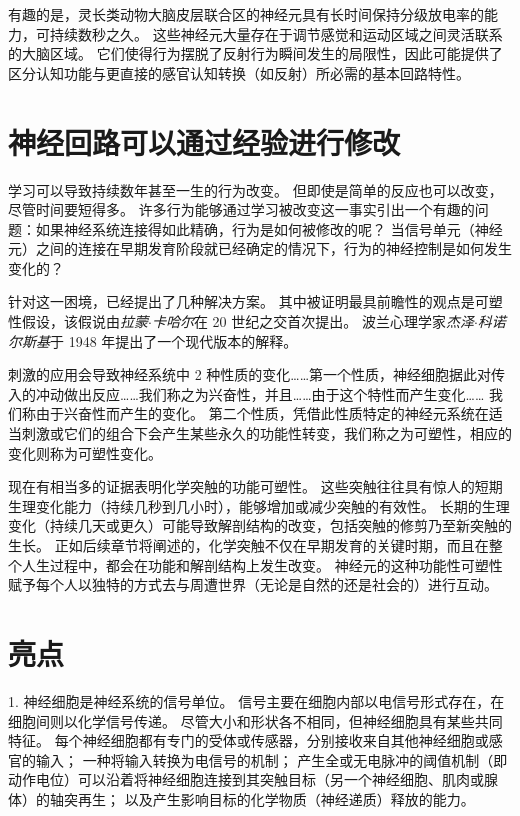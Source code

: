 有趣的是，灵长类动物大脑皮层联合区的神经元具有长时间保持分级放电率的能力，可持续数秒之久。 
这些神经元大量存在于调节感觉和运动区域之间灵活联系的大脑区域。 
它们使得行为摆脱了反射行为瞬间发生的局限性，因此可能提供了区分认知功能与更直接的感官认知转换（如反射）所必需的基本回路特性。


\section{神经回路可以通过经验进行修改}
学习可以导致持续数年甚至一生的行为改变。 
但即使是简单的反应也可以改变，尽管时间要短得多。 
许多行为能够通过学习被改变这一事实引出一个有趣的问题：如果神经系统连接得如此精确，行为是如何被修改的呢？ 
当信号单元（神经元）之间的连接在早期发育阶段就已经确定的情况下，行为的神经控制是如何发生变化的？


针对这一困境，已经提出了几种解决方案。 
其中被证明最具前瞻性的观点是可塑性假设，该假说由\textit{拉蒙$\cdot$卡哈尔}在 20 世纪之交首次提出。 
波兰心理学家\textit{杰泽$\cdot$科诺尔斯基}于 1948 年提出了一个现代版本的解释。


刺激的应用会导致神经系统中 2 种性质的变化……第一个性质，神经细胞据此对传入的冲动做出反应……我们称之为兴奋性，并且……由于这个特性而产生变化…… 我们称由于兴奋性而产生的变化。
第二个性质，凭借此性质特定的神经元系统在适当刺激或它们的组合下会产生某些永久的功能性转变，我们称之为可塑性，相应的变化则称为可塑性变化。


现在有相当多的证据表明化学突触的功能可塑性。 
这些突触往往具有惊人的短期生理变化能力（持续几秒到几小时），能够增加或减少突触的有效性。 
长期的生理变化（持续几天或更久）可能导致解剖结构的改变，包括突触的修剪乃至新突触的生长。 
正如后续章节将阐述的，化学突触不仅在早期发育的关键时期，而且在整个人生过程中，都会在功能和解剖结构上发生改变。
神经元的这种功能性可塑性赋予每个人以独特的方式去与周遭世界（无论是自然的还是社会的）进行互动。



\section{亮点}
1. 神经细胞是神经系统的信号单位。
信号主要在细胞内部以电信号形式存在，在细胞间则以化学信号传递。
尽管大小和形状各不相同，但神经细胞具有某些共同特征。
每个神经细胞都有专门的受体或传感器，分别接收来自其他神经细胞或感官的输入； 
一种将输入转换为电信号的机制；
产生全或无电脉冲的阈值机制（即动作电位）可以沿着将神经细胞连接到其突触目标（另一个神经细胞、肌肉或腺体）的轴突再生；
以及产生影响目标的化学物质（神经递质）释放的能力。


